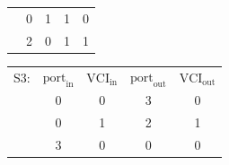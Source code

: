 \documentclass[10pt, a4paper]{article}
\begin{document}
\begin{enumerate}
\begin{enumerate}
\begin{enumerate}
\begin{tabular}{|c|c|c|c|c|}
                \cline {2-5}
                & 0 & 1 & 1 & 0\\
                \cline {2-5}
                & 2 & 0 & 1 & 1\\
                \hline
            \end{tabular}\qquad
            \begin{tabular}{|c|c|c|c|c|}
                \hline
                S3: & $\mbox{port}_{\mbox{in}}$ & $\mbox{VCI}_{\mbox{in}}$ & $\mbox{port}_{\mbox{out}}$ & $\mbox{VCI}_{\mbox{out}}$\\
                \cline {2-5}
                & 0 & 0 & 3 & 0\\
                \cline {2-5}
                & 0 & 1 & 2 & 1\\
                \cline {2-5}
                & 3 & 0 & 0 & 0\\
                \hline
            \end{tabular}\\


\end{enumerate}
\end{enumerate}
\end{enumerate}
\end{document}
